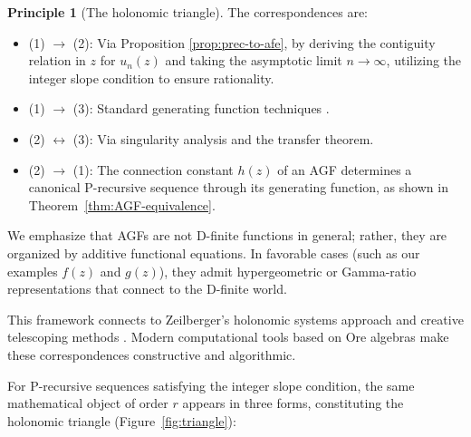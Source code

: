 \documentclass[11pt,reqno]{amsart}
\theoremstyle{definition}
\newtheorem{principle}{Principle}[section]
\numberwithin{equation}{section}
\begin{document}
\begin{principle}[The holonomic triangle]
The correspondences are:
\begin{itemize}
\item (1) $\to$ (2): Via Proposition \ref{prop:prec-to-afe}, by deriving the contiguity relation in $z$ for $u_n(z)$ and taking the asymptotic limit $n\to\infty$, utilizing the integer slope condition to ensure rationality.
\item (1) $\to$ (3): Standard generating function techniques \cite{FlajoletSedgewick2009}.
\item (2) $\leftrightarrow$ (3): Via singularity analysis and the transfer theorem.
\item (2) $\to$ (1): The connection constant $h(z)$ of an AGF determines a canonical P-recursive sequence through its generating function, as shown in Theorem~\ref{thm:AGF-equivalence}.
\end{itemize}

We emphasize that AGFs are not D-finite functions in general; rather, they are organized by additive functional equations. In favorable cases (such as our examples $f(z)$ and $g(z)$), they admit hypergeometric or Gamma-ratio representations that connect to the D-finite world.

This framework connects to Zeilberger's holonomic systems approach \cite{Zeilberger1990} and creative telescoping methods \cite{Zeilberger1991}. Modern computational tools based on Ore algebras \cite{ChyzakSalvy1998,Koutschan2010,KauersPaule2011} make these correspondences constructive and algorithmic.
\end{principle}

For P-recursive sequences satisfying the integer slope condition, the same mathematical object of order $r$ appears in three forms, constituting the holonomic triangle (Figure~\ref{fig:triangle}):
\end{document}
